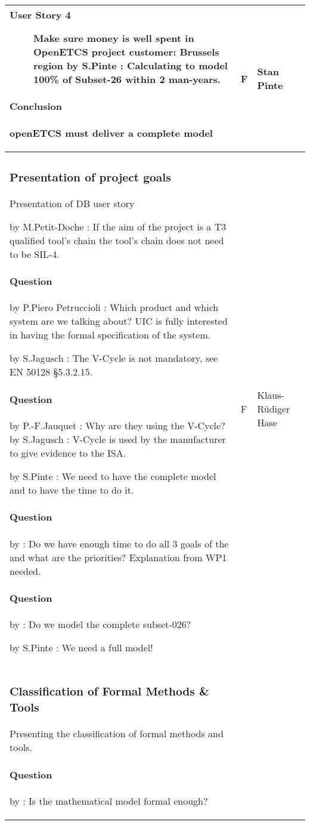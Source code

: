 \documentclass[a4paper]{article}
\newcommand{\Q}[2]{\paragraph{Question} 
	\ifthenelse{\isempty{#1}}%
    	{}%
    	{by #1}%
    : #2}
\newcommand{\A}[2]{\newline{\textbf{Answer}}
	\ifthenelse{\isempty{#1}}%
    	{}%
    	{by #1}%
    : #2}
\newcommand{\C}[2]{\newline{\textbf{Comment}}
	\ifthenelse{\isempty{#1}}%
    	{}%
    	{by #1}%
    : #2}
\begin{document}
\begin{longtable}{|p{}|p{}|p{}|}
\begin{description}
	\item [User Story 4] Make sure money is well spent in OpenETCS project \newline
		customer: Brussels region
		\C{S.Pinte}{Calculating to model 100\% of Subset-26 within 2 man-years.}
\end{description}

\paragraph{Conclusion} openETCS must deliver a complete model

& F
& Stan Pinte
\\\hline
\subsubsection*{Presentation of project goals}
Presentation of DB user story

\C{M.Petit-Doche}{If the aim of the project is a T3 qualified tool's chain the tool's chain does not need to be SIL-4.} 


\Q{P.Piero Petruccioli}{Which product and which system are we talking about?
UIC is fully interested in having the formal specification of the system.}

\C{S.Jagusch}{The V-Cycle is not mandatory, see EN 50128 \S 5.3.2.15.}  
\Q{P.-F.Jauquet}{Why are they using the V-Cycle?}
\A{S.Jagusch}{V-Cycle is used by the manufacturer to give evidence to the ISA.}

\C{S.Pinte}{We need to have the complete model and to have the time to do it.}
 
\Q{}{Do we have enough time to do all 3 goals of the and what are the priorities?}
Explanation from WP1 needed.

\Q{}{Do we model the complete subset-026?}

\C{S.Pinte}{We need a full model!}

& F
& Klaus-R\"{u}diger Hase
\\\hline
\subsubsection{Classification of Formal Methods \& Tools} %
Presenting the classification of formal methods and tools.

\Q{}{Is the mathematical model formal enough?}


\end{longtable}
\end{document}
